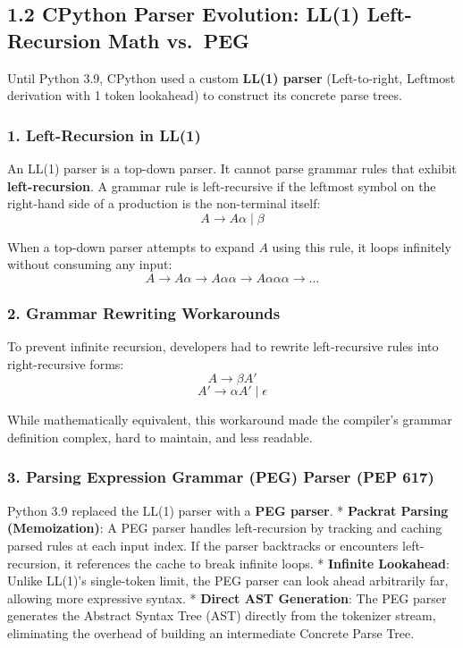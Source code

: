 \hypertarget{cpython-parser-evolution-ll1-left-recursion-math-vs.-peg}{%
\subsection{1.2 CPython Parser Evolution: LL(1) Left-Recursion Math
vs.~PEG}\label{cpython-parser-evolution-ll1-left-recursion-math-vs.-peg}}

Until Python 3.9, CPython used a custom \textbf{LL(1) parser}
(Left-to-right, Leftmost derivation with 1 token lookahead) to construct
its concrete parse trees.

\hypertarget{left-recursion-in-ll1}{%
\subsubsection{1. Left-Recursion in LL(1)}\label{left-recursion-in-ll1}}

An LL(1) parser is a top-down parser. It cannot parse grammar rules that
exhibit \textbf{left-recursion}. A grammar rule is left-recursive if the
leftmost symbol on the right-hand side of a production is the
non-terminal itself: \[A \to A \alpha \mid \beta\]

When a top-down parser attempts to expand \(A\) using this rule, it
loops infinitely without consuming any input:
\[A \to A \alpha \to A \alpha \alpha \to A \alpha \alpha \alpha \to \dots\]

\hypertarget{grammar-rewriting-workarounds}{%
\subsubsection{2. Grammar Rewriting
Workarounds}\label{grammar-rewriting-workarounds}}

To prevent infinite recursion, developers had to rewrite left-recursive
rules into right-recursive forms: \[A \to \beta A'\]
\[A' \to \alpha A' \mid \epsilon\]

While mathematically equivalent, this workaround made the compiler's
grammar definition complex, hard to maintain, and less readable.

\hypertarget{parsing-expression-grammar-peg-parser-pep-617}{%
\subsubsection{3. Parsing Expression Grammar (PEG) Parser (PEP
617)}\label{parsing-expression-grammar-peg-parser-pep-617}}

Python 3.9 replaced the LL(1) parser with a \textbf{PEG parser}. *
\textbf{Packrat Parsing (Memoization)}: A PEG parser handles
left-recursion by tracking and caching parsed rules at each input index.
If the parser backtracks or encounters left-recursion, it references the
cache to break infinite loops. * \textbf{Infinite Lookahead}: Unlike
LL(1)'s single-token limit, the PEG parser can look ahead arbitrarily
far, allowing more expressive syntax. * \textbf{Direct AST Generation}:
The PEG parser generates the Abstract Syntax Tree (AST) directly from
the tokenizer stream, eliminating the overhead of building an
intermediate Concrete Parse Tree.

